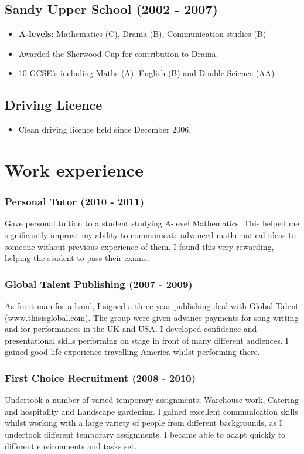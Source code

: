 \documentclass[11pt]{article}
\begin{document}
\subsection*{Sandy Upper School (2002 - 2007)}
\begin{itemize}
\item \textbf{A-levels}: Mathematics (C), Drama (B), Communication studies (B)
\item Awarded the Sherwood Cup for contribution to Drama.
\item 10 GCSE's including Maths (A), English (B) and Double Science (AA) 
\end{itemize}
\subsection*{Driving Licence}
\begin{itemize}
\item Clean driving licence held since December 2006.
\end{itemize}

\section*{Work experience}
\subsubsection*{Personal Tutor (2010 - 2011)}
Gave personal tuition to a student studying A-level Mathematics. This helped me significantly improve my ability to communicate advanced mathematical ideas to someone without previous experience of them. I found this very rewarding, helping the student to pass their exams.    
\subsubsection*{Global Talent Publishing (2007 - 2009)}
As front man for a band, I signed a three year publishing deal with Global Talent (www.thisisglobal.com). The group were given advance payments for song writing and for performances in the UK and USA. I developed confidence and presentational skills performing on stage in front of many different audiences. I gained good life experience travelling America whilst performing there.
\subsubsection*{First Choice Recruitment (2008 - 2010)}
Undertook a number of varied temporary assignments; Warehouse work, Catering and hospitality and Landscape gardening. I gained excellent communication skills whilst working with a large variety of people from different backgrounds, as I undertook different temporary assignments. I became able to adapt quickly to different environments and tasks set.
\end{document}
